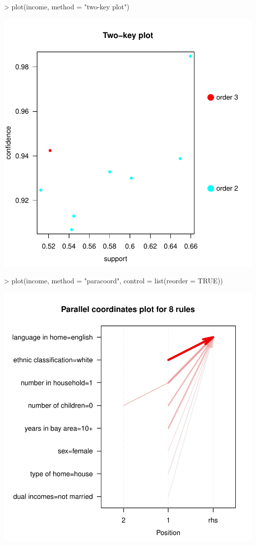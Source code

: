 \documentclass [a4paper] {article}
\begin{document}
\begin{center}
\begin{Schunk}
\begin{Sinput}
> plot(income, method = "two-key plot")
\end{Sinput}
\end{Schunk}
\includegraphics{entrega-grafica_apriori_income_two_key}
\begin{Schunk}
\begin{Sinput}
> plot(income, method = "paracoord", control = list(reorder = TRUE))
\end{Sinput}
\end{Schunk}
\includegraphics{entrega-grafica_apriori_income_paracoord}

\end{center}
\end{document}
